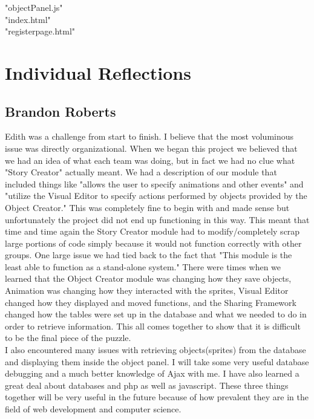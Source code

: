 \documentclass[12pt]{article}
\begin{document}
"objectPanel.js" \\

"index.html" \\

"registerpage.html" \\


\section{Individual Reflections}

\subsection{Brandon Roberts}
Edith was a challenge from start to finish.  I believe that the most voluminous issue was directly organizational.  When we began this project we believed that we had an idea of what each team was doing, but in fact we had no clue what "Story Creator" actually meant.  We had a description of our module that included things like "allows the user to specify animations and other events" and "utilize the Visual Editor to specify actions performed by objects provided by the Object Creator."  This was completely fine to begin with and made sense but unfortunately the project did not end up functioning in this way.  This meant that time and time again the Story Creator module had to modify/completely scrap large portions of code simply because it would not function correctly with other groups.  One large issue we had tied back to the fact that "This module is the least able to function as a stand-alone system."  There were times when we learned that the Object Creator module was changing how they save objects, Animation was changing how they interacted with the sprites, Visual Editor changed how they displayed and moved functions, and the Sharing Framework changed how the tables were set up in the database and what we needed to do in order to retrieve information.  This all comes together to show that it is difficult to be the final piece of the puzzle.  \\

I also encountered many issues with retrieving objects(sprites) from the database and displaying them inside the object panel.  I will take some very useful database debugging and a much better knowledge of Ajax with me.  I have also learned a great deal about databases and php as well as javascript.  These three things together will be very useful in the future because of how prevalent they are in the field of web development and computer science. \\
\end{document}
